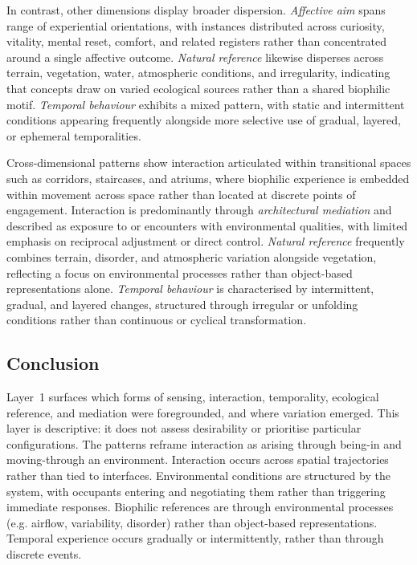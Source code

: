 In contrast, other dimensions display broader dispersion. \emph{Affective aim} spans range of experiential orientations, with instances distributed across curiosity, vitality, mental reset, comfort, and related registers rather than concentrated around a single affective outcome. \emph{Natural reference} likewise disperses across terrain, vegetation, water, atmospheric conditions, and irregularity, indicating that concepts draw on varied ecological sources rather than a shared biophilic motif. \emph{Temporal behaviour} exhibits a mixed pattern, with static and intermittent conditions appearing frequently alongside more selective use of gradual, layered, or ephemeral temporalities. 

Cross-dimensional patterns show interaction articulated within transitional spaces such as corridors, staircases, and atriums, where biophilic experience is embedded within movement across space rather than located at discrete points of engagement. Interaction is predominantly through \emph{architectural mediation} and described as exposure to or encounters with environmental qualities, with limited emphasis on reciprocal adjustment or direct control. \emph{Natural reference} frequently combines terrain, disorder, and atmospheric variation alongside vegetation, reflecting a focus on environmental processes rather than object-based representations alone. \emph{Temporal behaviour} is characterised by intermittent, gradual, and layered changes, structured through irregular or unfolding conditions rather than continuous or cyclical transformation.

\subsection{Conclusion}
Layer~1 surfaces which forms of sensing, interaction, temporality, ecological reference, and mediation were foregrounded, and where variation emerged. This layer is descriptive: it does not assess desirability or prioritise particular configurations. The patterns reframe interaction as arising through being-in and moving-through an environment. Interaction occurs across spatial trajectories rather than tied to interfaces. Environmental conditions are structured by the system, with occupants entering and negotiating them rather than triggering immediate responses. Biophilic references are through environmental processes (e.g. airflow, variability, disorder) rather than object-based representations. Temporal experience occurs gradually or intermittently, rather than through discrete events.
